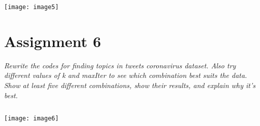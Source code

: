 \documentclass[]{article}
\begin{document}
\begin{verbatim}

\end{verbatim}
\texttt{[image: image5]} %


\section*{Assignment 6}
\emph{ Rewrite the codes for finding topics in tweets coronavirus dataset.  Also try different values of k and maxIter to see which combination best suits the data. Show at least five different combinations, show their results, and explain why it’s best.
 }

\begin{verbatim}

\end{verbatim}
\texttt{[image: image6]} %
\end{document}
